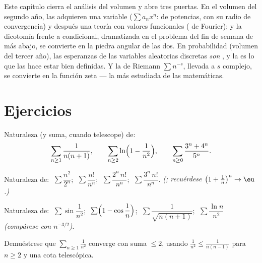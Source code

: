 \begin{remark}
Este capítulo cierra el análisis del volumen y abre tres puertas. En
el volumen del segundo año, las  adquieren una variable
($\sum a_n x^n$:  de potencias, con su radio de convergencia) y
después una teoría con valores funcionales ( de Fourier); y la
dicotomía  frente a condicional, dramatizada en
el problema del fin de semana de más abajo, se convierte en la piedra
angular de las dos. En probabilidad (volumen del tercer año), las
esperanzas de las variables aleatorias discretas \emph{son} , y
la  es lo que las hace estar bien definidas. Y
la  de Riemann $\sum n^{-s}$, llevada a $s$ complejo, se
convierte en la función zeta --- la  más estudiada de las
matemáticas.
\end{remark}

\section{Ejercicios}

\begin{exercise}[$\star$]\label{exo:b1:series:1}
Naturaleza (y suma, cuando telescope) de:
\[
\sum_{n\geq1} \frac{1}{n(n+1)},
\qquad
\sum_{n\geq2} \ln\Bigl(1 - \frac{1}{n^2}\Bigr),
\qquad
\sum_{n\geq0} \frac{3^n + 4^n}{5^n} .
\]
\end{exercise}

\begin{exercise}[$\star$]\label{exo:b1:series:2}
Naturaleza de: $\;\sum \dfrac{n^2}{2^n}$; $\;\sum \dfrac{n!}{n^n}$;
$\;\sum \dfrac{2^n\,n!}{n^n}$; $\;\sum \dfrac{3^n\,n!}{n^n}$.
\emph{(; recuérdese $\bigl(1 + \frac1n\bigr)^n \to \eu$.)}
\end{exercise}

\begin{exercise}[$\star$]\label{exo:b1:series:3}
Naturaleza de: $\;\sum \sin\dfrac{1}{n^2}$; $\;\sum
\Bigl(1 - \cos\dfrac1n\Bigr)$; $\;\sum \dfrac{1}{\sqrt{n(n+1)}}$;
$\;\sum \dfrac{\ln n}{n^2}$ \emph{(compárese con $n^{-3/2}$)}.
\end{exercise}

\begin{exercise}[$\star$]\label{exo:b1:series:4}
Demuéstrese que $\sum_{n\geq1} \frac{1}{n^2}$ converge con suma
$\leq 2$, usando $\frac{1}{n^2} \leq \frac{1}{n(n-1)}$ para
$n \geq 2$ y una cota telescópica.
\end{exercise}

